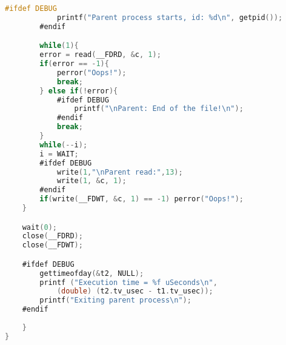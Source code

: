 \documentclass[11pt]{article}
\begin{document}
\begin{lstlisting}[language=C]
		#ifdef DEBUG
			printf("Parent process starts, id: %d\n", getpid());
		#endif

		while(1){
		error = read(__FDRD, &c, 1);
		if(error == -1){
			perror("Oops!");
			break;
		} else if(!error){
			#ifdef DEBUG
				printf("\nParent: End of the file!\n");
			#endif
			break;
		}
		while(--i);
		i = WAIT;
		#ifdef DEBUG
			write(1,"\nParent read:",13);
			write(1, &c, 1);
		#endif
		if(write(__FDWT, &c, 1) == -1) perror("Oops!");
	}

	wait(0);
	close(__FDRD);
	close(__FDWT);

	#ifdef DEBUG
		gettimeofday(&t2, NULL);
		printf ("Execution time = %f uSeconds\n", 
			(double) (t2.tv_usec - t1.tv_usec));
		printf("Exiting parent process\n");
	#endif
		
	}
}
\end{lstlisting}
\end{document}
